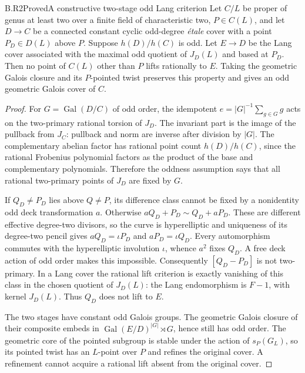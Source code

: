 \begin{claim}{B.R2}{Proved}{A constructive two-stage odd Lang criterion}
Let $C/L$ be proper of genus at least two over a finite field of
characteristic two, $P\in C(L)$, and let $D\to C$ be a connected
constant cyclic odd-degree \emph{\'etale} cover with a point
$P_D\in D(L)$ above $P$. Suppose $h(D)/h(C)$ is odd.
Let $E\to D$ be the Lang cover associated with the maximal odd
quotient of $J_D(L)$ and based at $P_D$. Then no point of $C(L)$
other than $P$ lifts rationally to $E$. Taking the geometric
Galois closure and its $P$-pointed twist preserves this property
and gives an odd geometric Galois cover of $C$.
\end{claim}
\begin{proof}
For $G=\operatorname{Gal}(D/C)$ of odd order, the idempotent
$e=|G|^{-1}\sum_{g\in G}g$ acts on the two-primary rational torsion
of $J_D$. The invariant part is the image of the pullback from
$J_C$: pullback and norm are inverse after division by $|G|$.
The complementary abelian factor has rational point count
$h(D)/h(C)$, since the rational Frobenius polynomial factors as
the product of the base and complementary polynomials. Therefore
the oddness assumption says that all rational two-primary points
of $J_D$ are fixed by $G$.

If $Q_D\ne P_D$ lies above $Q\ne P$, its difference class cannot be
fixed by a nonidentity odd deck transformation $a$. Otherwise
$aQ_D+P_D\sim Q_D+aP_D$. These are different effective degree-two
divisors, so the curve is hyperelliptic and uniqueness of its
degree-two pencil gives $aQ_D=\iota P_D$ and $aP_D=\iota Q_D$.
Every automorphism commutes with the hyperelliptic involution
$\iota$, whence $a^2$ fixes $Q_D$. A free deck action of odd order
makes this impossible. Consequently $[Q_D-P_D]$ is not
two-primary. In a Lang cover the rational lift criterion is
exactly vanishing of this class in the chosen quotient of
$J_D(L)$: the Lang endomorphism is $F-1$, with kernel $J_D(L)$.
Thus $Q_D$ does not lift to $E$.

The two stages have constant odd Galois groups. The geometric
Galois closure of their composite embeds in
$\operatorname{Gal}(E/D)^{|G|}\rtimes G$, hence still has odd order.
The geometric core of the pointed subgroup is stable under the
action of $s_P(G_L)$, so its pointed twist has an $L$-point over
$P$ and refines the original cover. A refinement cannot acquire
a rational lift absent from the original cover.
\end{proof}

